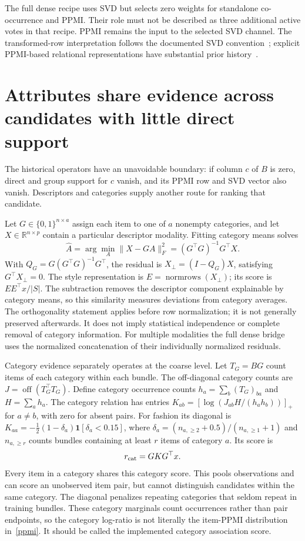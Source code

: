 \documentclass[11pt,a4paper]{article}
\newcommand{\off}{\operatorname{off}}
\newcommand{\normrows}{\operatorname{normrows}}
\newcommand{\pos}[1]{\left[#1\right]_+}
\begin{document}
The full dense recipe uses SVD but selects zero weights for standalone co-occurrence
and PPMI. Their role must not be described as three additional active votes in that
recipe. PPMI remains the input to the selected SVD channel. The transformed-row
interpretation follows the documented SVD convention~\cite{sklearn}; explicit
PPMI-based relational representations have substantial prior history~\cite{levy}.

\section{Attributes share evidence across candidates with little direct support}
The historical operators have an unavoidable boundary: if column $c$ of $B$ is
zero, direct and group support for $c$ vanish, and its PPMI row and SVD vector also
vanish. Descriptors and categories supply another route for ranking that candidate.

Let $G\in\{0,1\}^{n\times a}$ assign each item to one of $a$ nonempty categories,
and let $X\in\mathbb R^{n\times p}$ contain a particular descriptor modality.
Fitting category means solves
\begin{equation}
 \widehat A=\arg\min_A\|X-GA\|_F^2=(G^\top G)^{-1}G^\top X.
\end{equation}
With $Q_G=G(G^\top G)^{-1}G^\top$, the residual is
$X_\perp=(I-Q_G)X$, satisfying $G^\top X_\perp=0$.
The style representation is $E=\normrows(X_\perp)$; its score is
$EE^\top x/|S|$. The subtraction removes the descriptor component explainable
by category means, so this similarity measures deviations from category averages.
The orthogonality statement applies before row normalization; it is not generally
preserved afterwards. It does not imply statistical independence or complete
removal of category information. For multiple modalities the full dense bridge
uses the normalized concatenation of their individually normalized residuals.

Category evidence separately operates at the coarse level. Let $T_G=BG$ count
items of each category within each bundle. The off-diagonal category counts are
$J=\off(T_G^\top T_G)$. Define category occurrence counts
$h_a=\sum_b(T_G)_{ba}$ and $H=\sum_ah_a$. The category relation has entries
$K_{ab}=\pos{\log(J_{ab}H/(h_ah_b))}$ for $a\ne b$, with zero for absent pairs.
For fashion its diagonal is
$K_{aa}=-\tfrac12(1-\delta_a)\mathbf1[\delta_a<0.15]$, where
$\delta_a=(n_{a,\ge2}+0.5)/(n_{a,\ge1}+1)$ and $n_{a,\ge r}$ counts bundles
containing at least $r$ items of category $a$. Its score is
\begin{equation}
 r_{\rm cat}=GKG^\top x.
\end{equation}
Every item in a category shares this category score. This pools observations and
can score an unobserved item pair, but cannot distinguish candidates within the
same category. The diagonal penalizes repeating categories that seldom repeat in
training bundles. These category marginals count occurrences rather than pair
endpoints, so the category log-ratio is not literally the item-PPMI distribution
in~\eqref{ppmi}. It should be called the implemented category association score.
\end{document}
